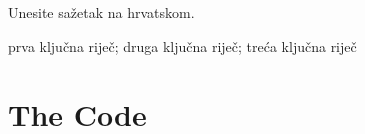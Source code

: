 \documentclass[bachelorthesis]{fer}
\begin{document}
\begin{sazetak}
  Unesite sažetak na hrvatskom.

  \blindtext
\end{sazetak}

\begin{kljucnerijeci}
  prva ključna riječ; druga ključna riječ; treća ključna riječ
\end{kljucnerijeci}




\backmatter

\chapter{The Code}

\Blindtext
\end{document}
